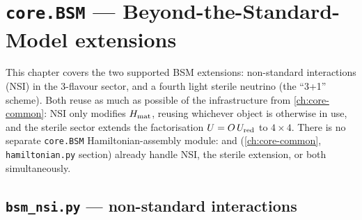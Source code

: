 \chapter{\texttt{core.BSM} --- Beyond-the-Standard-Model extensions}
\label{ch:core-bsm}

This chapter covers the two supported BSM extensions: non-standard
interactions (NSI) in the 3-flavour sector, and a fourth light sterile
neutrino (the ``3+1'' scheme). Both reuse as much as possible of the
infrastructure from \cref{ch:core-common}: NSI only modifies $H_{\rm mat}$,
reusing whichever  object is otherwise in use, and the
sterile sector extends the factorisation $U=O\,U_{\rm red}$ to
$4\times4$. There is no separate \texttt{core.BSM} Hamiltonian-assembly
module:  and 
(\cref{ch:core-common}, \texttt{hamiltonian.py} section) already handle NSI,
the sterile extension, or both simultaneously.

\section{\texttt{bsm\_nsi.py} --- non-standard interactions}


